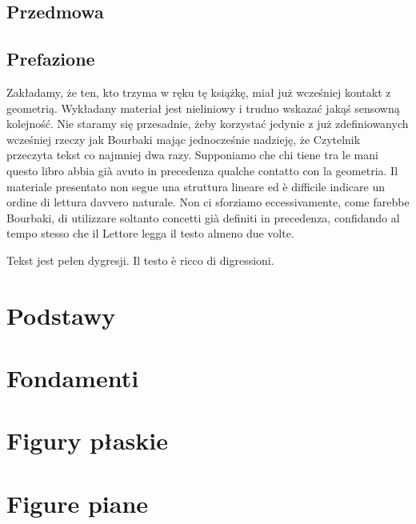 \documentclass{greaseproof}
\begin{document}
% 

\frontmatter
\maketitle

\tableofcontents

\chapter*{Przedmowa} %
\chapter*{Prefazione} %

Zakładamy, że ten, kto trzyma w ręku tę książkę, miał już wcześniej kontakt z geometrią. %
Wykładany materiał jest nieliniowy i trudno wskazać jakąś sensowną kolejność. %
Nie staramy się przesadnie, żeby korzystać jedynie z już zdefiniowanych wcześniej rzeczy jak Bourbaki mając jednocześnie nadzieję, że Czytelnik przeczyta tekst co najmniej dwa razy. %
Supponiamo che chi tiene tra le mani questo libro abbia già avuto in precedenza qualche contatto con la geometria. %
Il materiale presentato non segue una struttura lineare ed è difficile indicare un ordine di lettura davvero naturale. %
Non ci sforziamo eccessivamente, come farebbe Bourbaki, di utilizzare soltanto concetti già definiti in precedenza, confidando al tempo stesso che il Lettore legga il testo almeno due volte. %

Tekst jest pełen dygresji. %
Il testo è ricco di digressioni. %

\mainmatter

\part{Podstawy} %
\part{Fondamenti} %

\part{Figury płaskie} %
\part{Figure piane} %
\end{document}
